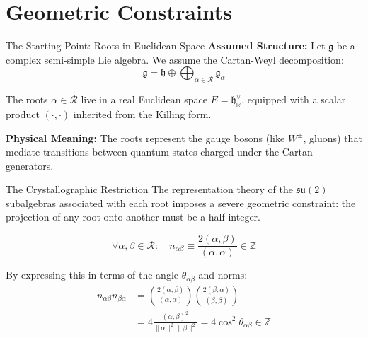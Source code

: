\section{Geometric Constraints}

\begin{frame}{The Starting Point: Roots in Euclidean Space}
    \textbf{Assumed Structure:} Let $\mathfrak{g}$ be a complex semi-simple Lie algebra.
    We assume the Cartan-Weyl decomposition:
    $$ \mathfrak{g} = \mathfrak{h} \oplus \bigoplus_{\alpha \in \mathcal{R}} \mathfrak{g}_\alpha $$

    The roots $\alpha \in \mathcal{R}$ live in a real Euclidean space $E = \mathfrak{h}_{\mathbb{R}}^\vee$, equipped with a scalar product $(\cdot, \cdot)$ inherited from the Killing form.

    \vspace{0.3cm}
    \textbf{Physical Meaning:} The roots represent the gauge bosons (like $W^\pm$, gluons) that mediate transitions between quantum states charged under the Cartan generators.

    \vfill
    \hyperlink{backup_rootsystem}{}
\end{frame}

\begin{frame}{The Crystallographic Restriction}
    The representation theory of the $\mathfrak{su}(2)$ subalgebras associated with each root imposes a severe geometric constraint: the projection of any root onto another must be a half-integer.

    \begin{equation}
        \forall \alpha, \beta \in \mathcal{R}: \quad n_{\alpha\beta} \equiv \frac{2(\alpha, \beta)}{(\alpha, \alpha)} \in \mathbb{Z}
    \end{equation}

    By expressing this in terms of the angle $\theta_{\alpha\beta}$ and norms:
    \begin{align}
        n_{\alpha\beta} n_{\beta\alpha} & = \left( \frac{2(\alpha, \beta)}{(\alpha, \alpha)} \right) \left( \frac{2(\beta, \alpha)}{(\beta, \beta)} \right) \nonumber  \\
                                        & = 4 \frac{(\alpha, \beta)^2}{\|\alpha\|^2 \|\beta\|^2} = 4 \cos^2 \theta_{\alpha\beta} \in \mathbb{Z} \label{eq:angle_quant}
    \end{align}

    \vfill
    \hyperlink{backup_angles}{}
\end{frame}

